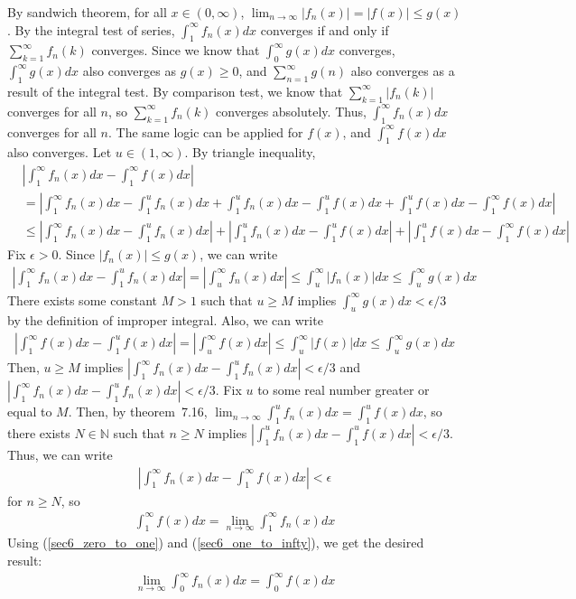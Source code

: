 \documentclass{scrartcl}
\begin{document}
By sandwich theorem, for all \(x \in (0, \infty)\), \(\lim_{n \to \infty}
|f_n(x)| = |f(x)| \leq g(x)\). By the integral test of series, \(\int^\infty_1
f_n(x) dx\) converges if and only if \(\sum^\infty_{k = 1} f_n(k)\) converges.
Since we know that \(\int^\infty_0 g(x) dx\) converges, \(\int^\infty_1 g(x)
dx\) also converges as \(g(x) \geq 0\), and \(\sum^\infty_{n = 1} g(n)\) also
converges as a result of the integral test. By comparison test, we know that
\(\sum^\infty_{k = 1} |f_n(k)|\) converges for all \(n\), so \(\sum^\infty_{k =
1} f_n(k)\) converges absolutely. Thus, \(\int^\infty_1 f_n(x) dx\) converges
for all \(n\). The same logic can be applied for \(f(x)\), and \(\int^\infty_1
f(x) dx\) also converges. Let \(u \in (1, \infty)\). By triangle inequality,
\begin{align*}
  &\left| \int^\infty_1 f_n(x) dx - \int^\infty_1 f(x) dx \right| \\
  &= \left| \int^\infty_1 f_n(x) dx - \int^u_1 f_n(x) dx + \int^u_1 f_n(x) dx
  - \int^u_1 f(x) dx + \int^u_1 f(x) dx - \int^\infty_1 f(x) dx\right| \\
  &\leq \left| \int^\infty_1 f_n(x) dx - \int^u_1 f_n(x) dx \right|
  + \left| \int^u_1 f_n(x) dx - \int^u_1 f(x) dx \right|
  + \left| \int^u_1 f(x) dx - \int^\infty_1 f(x) dx \right|
\end{align*}
Fix \(\epsilon > 0\).
Since \(|f_n(x)| \leq g(x)\), we can write
\begin{align*}
  \left| \int^\infty_1 f_n(x) dx - \int^u_1 f_n(x) dx \right|
  = \left| \int^\infty_u f_n(x) dx \right|
  \leq \int^\infty_u |f_n(x)| dx
  \leq \int^\infty_u g(x) dx
\end{align*}
There exists some constant \(M > 1\) such that \(u \geq M\) implies
\(\int^\infty_u g(x) dx < \epsilon / 3\) by the definition of improper
integral. Also, we can write
\begin{align*}
  \left| \int^\infty_1 f(x) dx - \int^u_1 f(x) dx \right|
  = \left| \int^\infty_u f(x) dx \right|
  \leq \int^\infty_u |f(x)| dx
  \leq \int^\infty_u g(x) dx
\end{align*}
Then, \(u \geq M\) implies \(\left| \int^\infty_1 f_n(x) dx - \int^u_1 f_n(x)
dx \right| < \epsilon / 3\) and \(\left| \int^\infty_1 f_n(x) dx - \int^u_1
f_n(x) dx \right| < \epsilon / 3\).
Fix \(u\) to some real number greater or equal to \(M\). Then, by theorem~7.16,
\(\lim_{n \to \infty} \int^u_1 f_n(x) dx = \int^u_1 f(x) dx\), so there exists
\(N \in \mathbb{N}\) such that \(n \geq N\) implies \(\left| \int^u_1 f_n(x) dx
- \int^u_1 f(x) dx \right| < \epsilon / 3\). Thus, we can write
\begin{align*}
  \left| \int^\infty_1 f_n(x) dx - \int^\infty_1 f(x) dx \right| < \epsilon
\end{align*}
for \(n \geq N\), so
\begin{align}\label{sec6_one_to_infty}
  \int^\infty_1 f(x) dx = \lim_{n \to \infty} \int^\infty_1 f_n(x) dx
\end{align}
Using (\ref{sec6_zero_to_one}) and (\ref{sec6_one_to_infty}), we get the
desired result:
\begin{align*}
  \lim_{n \to \infty} \int^\infty_0 f_n(x) dx = \int^\infty_0 f(x) dx
\end{align*}
\end{document}
